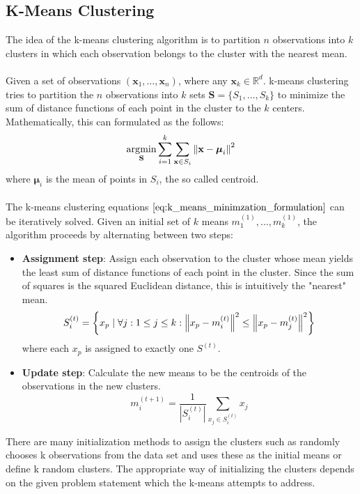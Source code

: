 \subsection{K-Means Clustering}
\label{sec:k_means}
The idea of the k-means clustering algorithm is to partition $n$ observations into $k$ clusters in which each observation belongs to the cluster with the nearest mean. \\ \\
Given a set of observations $(\textbf{x}_1, \dots, \textbf{x}_n)$, where any $\textbf{x}_k \in \mathbb{R}^d$. k-means clustering tries to partition the $n$ observations into $k$ sets $\textbf{S} = \{ S_1, \dots, S_k\}$ to minimize the sum of distance functions of each point in the cluster to the $k$ centers. Mathematically, this can formulated as the follows:
\begin{equation}
	\operatorname*{\arg\!\min}_{\textbf{S}} \sum_{i=1}^k \sum_{\textbf{x} \in S_i} \left\lVert\textbf{x} - {\boldsymbol {\mu }}_{i}\right\rVert^2
\label{eq:k_means_minimzation_formulation}
\end{equation}
where ${\boldsymbol {\mu }}_{i}$ is the mean of points in $S_i$, the so called centroid. \\ \\
The k-means clustering equations $\ref{eq:k_means_minimzation_formulation}$ can be iteratively solved. Given an initial set of $k$ means $m_1^{(1)}, \dots, m_k^{(1)}$, the algorithm proceeds by alternating between two steps:
\begin{itemize}
\item \textbf{Assignment step}: Assign each observation to the cluster whose mean yields the least sum of distance functions of each point in the cluster. Since the sum of squares is the squared Euclidean distance, this is intuitively the "nearest" mean. 
\begin{equation}
  	S_i^{(t)} = \left\{ x_p \mid \forall j: 1 \leq j \leq k: \left\lVert x_p - m_i^{(t)}\right\rVert^2 \leq \left\lVert x_p - m_j^{(t)}\right\rVert^2 \right\}
\end{equation} 
where each $x_p$ is assigned to exactly one $S^{(t)}$.
\item \textbf{Update step}: Calculate the new means to be the centroids of the observations in the new clusters. 
\begin{equation}
	m_i^{(t+1)} = \frac{1}{\left| S_i^{(t)} \right| } \sum_{x_j \in S_i^{(t)}} x_j
\end{equation}
\end{itemize}
There are many initialization methods to assign the clusters such as randomly chooses k observations from the data set and uses these as the initial means or define k random clusters. The appropriate way of initializing the clusters depends on the given problem statement which the k-means attempts to address. 

